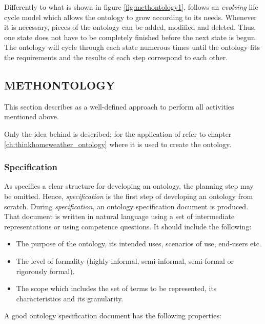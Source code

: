 Differently to what is shown in figure \ref{fig:methontology1}, \methontology follows an \emph{evolving} life cycle model which allows the ontology to grow according to its needs. Whenever it is necessary, pieces of the ontology can be added, modified and deleted. Thus, one state does not have to be completely finished before the next state is begun. The ontology will cycle through each state numerous times until the ontology fits the requirements and the results of each step correspond to each other.

\subsection{METHONTOLOGY}
\label{sec:methontology}

This section describes \methontology as a well-defined approach to perform all activities mentioned above.

Only the idea behind \methontology is described; for the application of \methontology refer to chapter \ref{ch:thinkhomeweather_ontology} where it is used to create the \thinkhomeweather ontology.

\subsubsection{Specification}


As \methontology specifies a clear structure for developing an ontology, the planning step may be omitted. Hence, \emph{specification} is the first step of developing an ontology from scratch. During \emph{specification}, an ontology specification document is produced. That document is written in natural language using a set of intermediate representations or using competence questions. It should include the following:

\begin{itemize}
  \item The purpose of the ontology, its intended uses, scenarios of use, end-users etc.
  \item The level of formality (highly informal, semi-informal, semi-formal or rigorously formal). %
  \item The scope which includes the set of terms to be represented, its characteristics and its granularity.
\end{itemize}

A good ontology specification document has the following properties:

